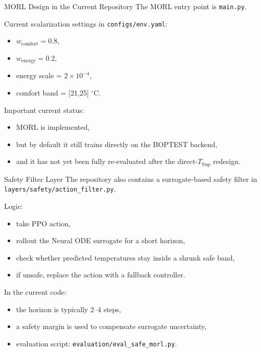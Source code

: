 \documentclass[aspectratio=169,11pt]{beamer}
\newcommand{\degc}{\ensuremath{^\circ\mathrm{C}}}
\begin{document}
\begin{frame}{MORL Design in the Current Repository}
  The MORL entry point is \texttt{main.py}.

  \vspace{0.5em}
  Current scalarization settings in \texttt{configs/env.yaml}:
  \begin{itemize}
    \item $w_{\mathrm{comfort}} = 0.8$,
    \item $w_{\mathrm{energy}} = 0.2$,
    \item energy scale = $2 \times 10^{-4}$,
    \item comfort band = [21,25] \degc{}.
  \end{itemize}

  Important current status:
  \begin{itemize}
    \item MORL is implemented,
    \item but by default it still trains directly on the BOPTEST backend,
    \item and it has not yet been fully re-evaluated after the direct-$T_{\mathrm{Sup}}$ redesign.
  \end{itemize}
\end{frame}

\begin{frame}{Safety Filter Layer}
  The repository also contains a surrogate-based safety filter in \texttt{layers/safety/action\_filter.py}.

  \vspace{0.5em}
  Logic:
  \begin{itemize}
    \item take PPO action,
    \item rollout the Neural ODE surrogate for a short horizon,
    \item check whether predicted temperatures stay inside a shrunk safe band,
    \item if unsafe, replace the action with a fallback controller.
  \end{itemize}

  \vspace{0.5em}
  In the current code:
  \begin{itemize}
    \item the horizon is typically 2--4 steps,
    \item a safety margin is used to compensate surrogate uncertainty,
    \item evaluation script: \texttt{evaluation/eval\_safe\_morl.py}.
  \end{itemize}
\end{frame}
\end{document}
